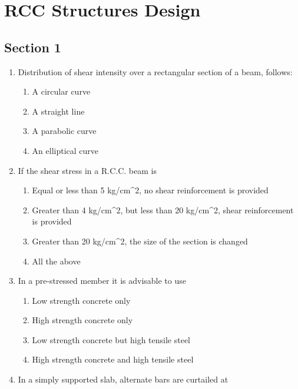 \documentclass[11pt,a4paper]{article}
\begin{document}
\section{RCC Structures Design}
\subsection*{Section 1}
\begin{enumerate}
\item{Distribution of shear intensity over a rectangular section of a beam, follows:}
\begin{enumerate}[label=\Alph*.]
\item{A circular curve}
\item{A straight line}
\item{A parabolic curve}
\item{An elliptical curve}
\end{enumerate}
\item{If the shear stress in a R.C.C. beam is}
\begin{enumerate}[label=\Alph*.]
\item{Equal or less than 5 kg/cm\^{}2, no shear reinforcement is provided}
\item{Greater than 4 kg/cm\^{}2, but less than 20 kg/cm\^{}2, shear reinforcement is provided}
\item{Greater than 20 kg/cm\^{}2, the size of the section is changed}
\item{All the above}
\end{enumerate}
\item{In a pre-stressed member it is advisable to use}
\begin{enumerate}[label=\Alph*.]
\item{Low strength concrete only}
\item{High strength concrete only}
\item{Low strength concrete but high tensile steel}
\item{High strength concrete and high tensile steel}
\end{enumerate}
\item{In a simply supported slab, alternate bars are curtailed at}
\\
\end{enumerate}
\end{document}

